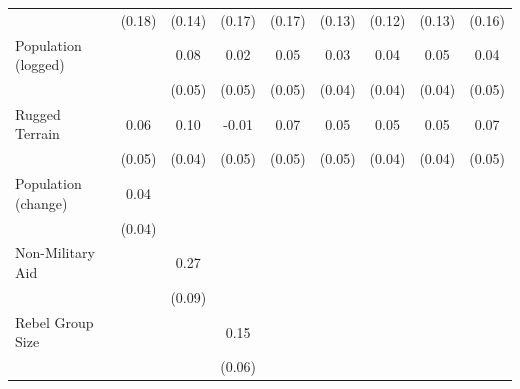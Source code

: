 \documentclass[12pt, letterpaper]{article}
\begin{document}
\begin{table}[htbp]
\begin{small}
\begin{tabular}{l*{8}{c}}
                    &      (0.18)         &      (0.14)         &      (0.17)         &      (0.17)         &      (0.13)         &      (0.12)         &      (0.13)         &      (0.16)         \\
Population (logged) &                     &        0.08         &        0.02         &        0.05         &        0.03         &        0.04         &        0.05         &        0.04         \\
                    &                     &      (0.05)         &      (0.05)         &      (0.05)         &      (0.04)         &      (0.04)         &      (0.04)         &      (0.05)         \\

Rugged Terrain      &        0.06         &        0.10\sym{**} &       -0.01         &        0.07         &        0.05         &        0.05         &        0.05         &        0.07         \\
                    &      (0.05)         &      (0.04)         &      (0.05)         &      (0.05)         &      (0.05)         &      (0.04)         &      (0.04)         &      (0.05)         \\
Population (change) &        0.04         &                     &                     &                     &                     &                     &                     &                     \\
                    &      (0.04)         &                     &                     &                     &                     &                     &                     &                     \\
Non-Military Aid    &                     &        0.27\sym{***}&                     &                     &                     &                     &                     &                     \\
                    &                     &      (0.09)         &                     &                     &                     &                     &                     &                     \\
Rebel Group Size    &                     &                     &        0.15\sym{**} &                     &                     &                     &                     &                     \\
                    &                     &                     &      (0.06)         &                     &                     &                     &                     &                     \\

\end{tabular}
\end{small}
\end{table}
\end{document}

